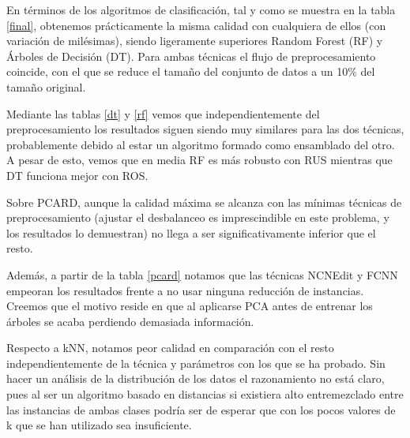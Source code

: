 En términos de los algoritmos de clasificación, tal y como se muestra en la tabla \ref{final}, obtenemos prácticamente la misma calidad con cualquiera de ellos (con variación de milésimas), siendo ligeramente superiores Random Forest (RF) y Árboles de Decisión (DT). Para ambas técnicas el flujo de preprocesamiento coincide, con el que se reduce el tamaño del conjunto de datos a un 10\% del tamaño original.

Mediante las tablas \ref{dt} y \ref{rf} vemos que independientemente del preprocesamiento los resultados siguen siendo muy similares para las dos técnicas, probablemente debido al estar un algoritmo formado como ensamblado del otro. A pesar de esto, vemos que en media RF es más robusto con RUS mientras que DT funciona mejor con ROS.

\vspace{\baselineskip}

Sobre PCARD, aunque la calidad máxima se alcanza con las mínimas técnicas de preprocesamiento (ajustar el desbalanceo es imprescindible en este problema, y los resultados lo demuestran) no llega a ser significativamente inferior que el resto. 

Además, a partir de la tabla \ref{pcard} notamos que las técnicas NCNEdit y FCNN empeoran los resultados frente a no usar ninguna reducción de instancias. Creemos que el motivo reside en que al aplicarse PCA antes de entrenar los árboles se acaba perdiendo demasiada información. 

\vspace{\baselineskip}

Respecto a kNN, notamos peor calidad en comparación con el resto independientemente de la técnica y parámetros con los que se ha probado. Sin hacer un análisis de la distribución de los datos el razonamiento no está claro, pues al ser un algoritmo basado en distancias si existiera alto entremezclado entre las instancias de ambas clases podría ser de esperar que con los pocos valores de k que se han utilizado sea insuficiente.

\newpage

